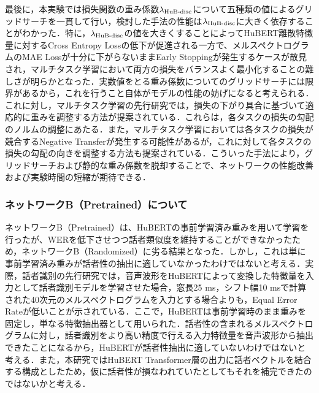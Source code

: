 最後に，本実験では損失関数の重み係数$\lambda_{\text{HuB-disc}}$について五種類の値によるグリッドサーチを一貫して行い，検討した手法の性能は$\lambda_{\text{HuB-disc}}$に大きく依存することがわかった．特に，$\lambda_{\text{HuB-disc}}$の値を大きくすることによってHuBERT離散特徴量に対するCross Entropy Lossの低下が促進される一方で、メルスペクトログラムのMAE Lossが十分に下がらないままEarly Stoppingが発生するケースが散見され，マルチタスク学習において両方の損失をバランスよく最小化することの難しさが明らかとなった．実数値をとる重み係数についてのグリッドサーチには限界があるから，これを行うこと自体がモデルの性能の妨げになると考えられる．これに対し，マルチタスク学習の先行研究では，損失の下がり具合に基づいて適応的に重みを調整する方法\cite{chen2018gradnorm,liu2019end}が提案されている．これらは，各タスクの損失の勾配のノルムの調整にあたる．また，マルチタスク学習においては各タスクの損失が競合するNegative Transfer\cite{crawshaw2020multi}が発生する可能性があるが，これに対して各タスクの損失の勾配の向きを調整する方法\cite{yu2020gradient}も提案されている．こういった手法により，グリッドサーチおよび静的な重み係数を脱却することで、ネットワークの性能改善および実験時間の短縮が期待できる．

\subsubsection{ネットワークB（Pretrained）について}
ネットワークB（Pretrained）は、HuBERTの事前学習済み重みを用いて学習を行ったが、WERを低下させつつ話者類似度を維持することができなかったため，ネットワークB（Randomized）に劣る結果となった．しかし，これは単に事前学習済み重みが話者性の抽出に適していなかったわけではないと考える．実際，話者識別の先行研究\cite{chen2022large}では，音声波形をHuBERTによって変換した特徴量を入力として話者識別モデルを学習させた場合，窓長25 ms，シフト幅10 msで計算された40次元のメルスペクトログラムを入力とする場合よりも，Equal Error Rateが低いことが示されている．ここで，HuBERTは事前学習時のまま重みを固定し，単なる特徴抽出器として用いられた．話者性の含まれるメルスペクトログラムに対し，話者識別をより高い精度で行える入力特徴量を音声波形から抽出できたことになるから，HuBERTが話者性抽出に適していないわけではないと考える．また，本研究ではHuBERT Transformer層の出力に話者ベクトルを結合する構成としたため，仮に話者性が損なわれていたとしてもそれを補完できたのではないかと考える．

